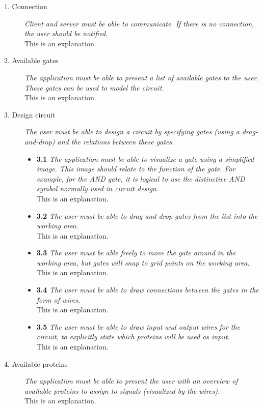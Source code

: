 \documentclass[a4paper]{article}
\begin{document}
\begin{description}
\item[1. Connection] \textit{Client and server must be able to communicate. If there is no connection, the user should be notified.}\\
This is an explanation.

\item[2. Available gates] \textit{The application must be able to present a list of available gates to the user. These gates can be used to model the circuit.}\\
This is an explanation.

\item[3. Design circuit] \textit{The user must be able to design a circuit by specifying gates (using a drag-and-drop) and the relations between these gates.}
	\begin{itemize}
	\item \textbf{3.1} \textit{The application must be able to visualize a gate using a simplified image. This image should relate to the function of the gate. For example, for the AND gate, it is logical to use the distinctive AND symbol normally used in circuit design.}\\
	This is an explanation.

	\item \textbf{3.2} \textit{The user must be able to drag and drop gates from the list into the working area.}\\
	This is an explanation.

	\item \textbf{3.3} \textit{The user must be able freely to move the gate around in the working area, but gates will snap to grid points on the working area.}\\
	This is an explanation.

	\item \textbf{3.4} \textit{The user must be able to draw connections between the gates in the form of wires.}\\
	This is an explanation.

	\item \textbf{3.5} \textit{The user must be able to draw input and output wires for the circuit, to explicitly state which proteins will be used as input.}\\
	This is an explanation.

	\end{itemize}
\item[4. Available proteins] \textit{The application must be able to present the user with an overview of available proteins to assign to signals (visualized by the wires).}\\
This is an explanation.


\end{description}
\end{document}
